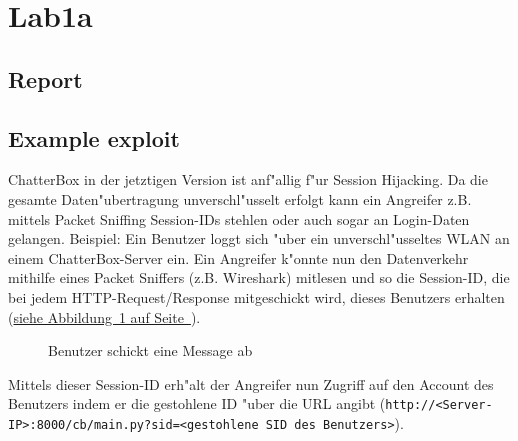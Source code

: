 \documentclass[12pt,a4paper,titlepage,oneside]{scrartcl}
\begin{document}
\maketitle
\setcounter{section}{0}
\setcounter{tocdepth}{2}
\tableofcontents

%
%

\section{Lab1a}

\subsection{Report}

\subsection{Example exploit}
ChatterBox in der jetztigen Version ist anf"allig f"ur Session Hijacking. Da die gesamte Daten"ubertragung unverschl"usselt erfolgt kann ein Angreifer z.B. mittels Packet Sniffing Session-IDs stehlen oder auch sogar an Login-Daten gelangen.
\newline
\newline
Beispiel:
\newline
Ein Benutzer loggt sich "uber ein unverschl"usseltes WLAN an einem ChatterBox-Server ein. Ein Angreifer k"onnte nun den Datenverkehr mithilfe eines Packet Sniffers (z.B. Wireshark) mitlesen und so die Session-ID, die bei jedem HTTP-Request/Response mitgeschickt wird, dieses Benutzers erhalten (\hyperref[fig:message]{siehe Abbildung~\ref*{fig:message} auf Seite~\pageref*{fig:message}}).
\begin{figure}[h!]
  \centering
  \caption{Benutzer schickt eine Message ab}
  \label{fig:message}
\end{figure}
\newline
\newline
Mittels dieser Session-ID erh"alt der Angreifer nun Zugriff auf den Account des Benutzers indem er die gestohlene ID "uber die URL angibt (\lstinline{http://<Server-IP>:8000/cb/main.py?sid=<gestohlene SID des Benutzers>}).
\end{document}
